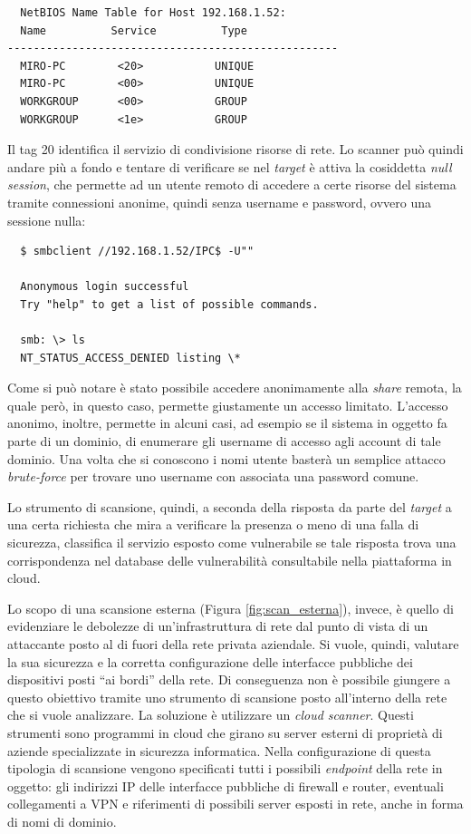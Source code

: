 \documentclass[target=bach,aauheader=]{thud}
\begin{document}
\begin{verbatim}
  NetBIOS Name Table for Host 192.168.1.52:
  Name          Service          Type
---------------------------------------------------
  MIRO-PC        <20>           UNIQUE
  MIRO-PC        <00>           UNIQUE
  WORKGROUP      <00>           GROUP
  WORKGROUP      <1e>           GROUP
\end{verbatim}

Il tag 20 identifica il servizio di condivisione risorse di rete. Lo scanner può quindi andare più a fondo e tentare di verificare se nel \textit{target} è attiva la cosiddetta \textit{null session}, che permette ad un utente remoto di accedere a certe risorse del sistema tramite connessioni anonime, quindi senza username e password, ovvero una sessione nulla:

\begin{verbatim}
  $ smbclient //192.168.1.52/IPC$ -U""

  Anonymous login successful
  Try "help" to get a list of possible commands.
  
  smb: \> ls
  NT_STATUS_ACCESS_DENIED listing \*
\end{verbatim}

Come si può notare è stato possibile accedere anonimamente alla \textit{share} remota, la quale però, in questo caso, permette giustamente un accesso limitato. L’accesso anonimo, inoltre, permette in alcuni casi, ad esempio se il sistema in oggetto fa parte di un dominio, di enumerare gli username di accesso agli account di tale dominio. Una volta che si conoscono i nomi utente basterà un semplice attacco \textit{brute-force} per trovare uno username con associata una password comune.

Lo strumento di scansione, quindi, a seconda della risposta da parte del \textit{target} a una certa richiesta che mira a verificare la presenza o meno di una falla di sicurezza, classifica il servizio esposto come vulnerabile se tale risposta trova una corrispondenza nel database delle vulnerabilità consultabile nella piattaforma in cloud.

Lo scopo di una scansione esterna (Figura \ref{fig:scan_esterna}), invece, è quello di evidenziare le debolezze di un’infrastruttura di rete dal punto di vista di un attaccante posto al di fuori della rete privata aziendale. Si vuole, quindi, valutare la sua sicurezza e la corretta configurazione delle interfacce pubbliche dei dispositivi posti “ai bordi” della rete. Di conseguenza non è possibile giungere a questo obiettivo tramite uno strumento di scansione posto all’interno della rete che si vuole analizzare. La soluzione è utilizzare un \textit{cloud scanner}. Questi strumenti sono programmi in cloud che girano su server esterni di proprietà di aziende specializzate in sicurezza informatica. Nella configurazione di questa tipologia di scansione vengono specificati tutti i possibili \textit{endpoint} della rete in oggetto: gli indirizzi IP delle interfacce pubbliche di firewall e router, eventuali collegamenti a VPN e riferimenti di possibili server esposti in rete, anche in forma di nomi di dominio.
\end{document}
